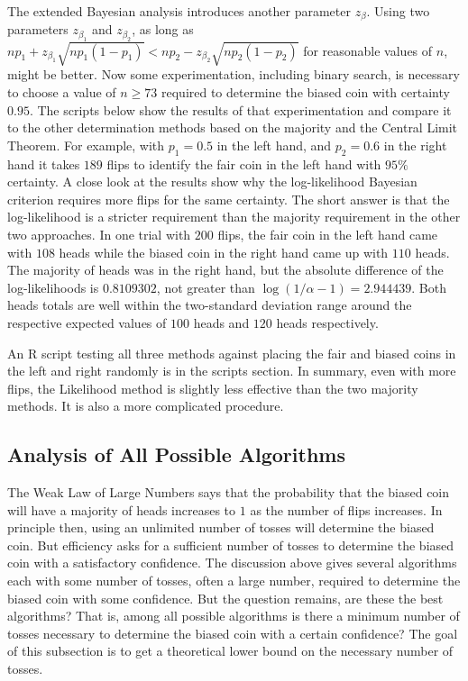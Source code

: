 \documentclass[12pt]{article}
\begin{document}
The extended Bayesian analysis introduces another parameter \( z_{\beta}
\).  Using two parameters \( z_{\beta_1} \) and \( z_{\beta_2} \), as
long as \( np_1+z_{\beta_1}\sqrt{np_1(1-p_1)} < np_2-z_{\beta_2}\sqrt{np_2
(1-p_2)} \) for reasonable values of \( n \), might be better. Now some
experimentation, including binary search, is necessary to choose a value
of \( n \ge 73 \) required to determine the biased coin with certainty \(
0.95 \).  The scripts below show the results of that experimentation and
compare it to the other determination methods based on the majority and
the Central Limit Theorem.  For example, with \( p_1 = 0.5 \) in the
left hand, and \( p_2 = 0.6 \) in the right hand it takes \( 189 \)
flips to identify the fair coin in the left hand with \( 95\% \)
certainty.  A close look at the results show why the log-likelihood
Bayesian criterion requires more flips for the same certainty.  The
short answer is that the log-likelihood is a stricter requirement than
the majority requirement in the other two approaches.  In one trial with
\( 200 \) flips, the fair coin in the left hand came with \( 108 \)
heads while the biased coin in the right hand came up with \( 110 \)
heads.  The majority of heads was in the right hand, but the absolute
difference of the log-likelihoods is \( 0.8109302 \), not greater than \(
\log(1/\alpha-1) = 2.944439 \).  Both heads totals are well within the
two-standard deviation range around the respective expected values of \(
100 \) heads and \( 120 \) heads respectively.

An R script testing all three methods against placing the fair and
biased coins in the left and right randomly is in the scripts section.
In summary, even with more flips, the Likelihood method is slightly less
effective than the two majority methods.  It is also a more complicated
procedure.

\subsection*{Analysis of All Possible Algorithms}

The Weak
Law of Large Numbers says that the probability that the biased coin will
have a majority of heads increases to \( 1 \) as the number of flips
increases.  In principle then, using an unlimited number of tosses will
determine the biased coin.  But efficiency asks for a sufficient
number of tosses to determine the biased coin with a satisfactory
confidence.  The discussion above gives several algorithms each with
some number of tosses, often a large number, required to determine the
biased coin with some confidence.  But the question remains, are
these the best algorithms?  That is,  among all possible algorithms is
there a minimum number of tosses necessary to determine the biased
coin with a certain confidence?  The goal of this subsection is to get
a theoretical lower bound on the necessary number of tosses.
\end{document}
